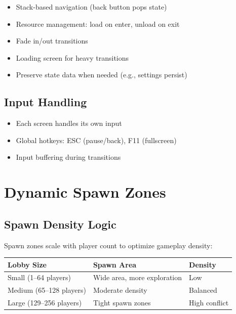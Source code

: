 \documentclass[11pt]{article}
\begin{document}
\begin{itemize}
  \item Stack-based navigation (back button pops state)
  \item Resource management: load on enter, unload on exit
  \item Fade in/out transitions
  \item Loading screen for heavy transitions
  \item Preserve state data when needed (e.g., settings persist)
\end{itemize}

\subsection{Input Handling}

\begin{itemize}
  \item Each screen handles its own input
  \item Global hotkeys: ESC (pause/back), F11 (fullscreen)
  \item Input buffering during transitions
\end{itemize}

\section{Dynamic Spawn Zones}

\subsection{Spawn Density Logic}

Spawn zones scale with player count to optimize gameplay density:

\begin{longtable}{|>{\raggedright\arraybackslash}p{}|>{\raggedright\arraybackslash}p{}|>{\raggedright\arraybackslash}p{}|}
\hline
\textbf{Lobby Size} & \textbf{Spawn Area} & \textbf{Density} \\
\hline
Small (1--64 players) & Wide area, more exploration & Low \\
\hline
Medium (65--128 players) & Moderate density & Balanced \\
\hline
Large (129--256 players) & Tight spawn zones & High conflict \\
\hline
\end{longtable}
\end{document}
